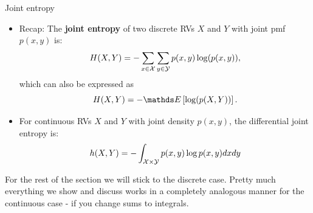 \documentclass[11pt,compress,t,notes=noshow, xcolor=table]{beamer}
\begin{document}
    

\begin{vbframe}{Joint entropy}
\begin{itemize}
  \item Recap: The \textbf{joint entropy} of two discrete RVs $X$ and $Y$ with joint pmf $p(x, y)$ is:
  $$ H(X,Y) = -\sum_{x \in \mathcal{X}} \sum_{y \in \mathcal{Y}}  p(x,y) \log(p(x,y)),$$ 
  which can also be expressed as $$ H(X,Y) = -\E \left[ \log(p(X,Y)) \right].$$
  \item For continuous RVs $X$ and $Y$ with joint density $p(x,y)$, the differential joint entropy is:\\
  $$ h(X,Y) = - \int_{\mathcal{X} \times \mathcal{Y}} p(x,y) \log p(x,y) dx dy$$
\end{itemize}

\begin{footnotesize}
For the rest of the section we will stick to the discrete case. Pretty much everything we show and discuss works in a completely analogous manner for the continuous case - if you change sums to integrals.
\end{footnotesize}

\end{vbframe}
\end{document}
